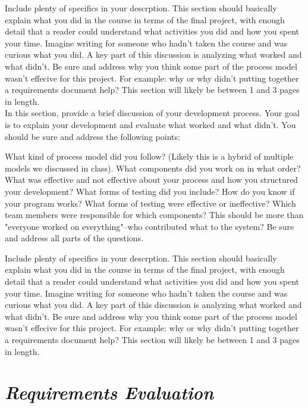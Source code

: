 \documentclass[12pt]{article}
\begin{document}
Include plenty of specifics in your descrption. This section should basically explain what you did in the course in terms of the final project, with enough detail that a reader could understand what activities you did and how you spent your time. Imagine writing for someone who hadn't taken the course and was curious what you did.
A key part of this discussion is analyzing what worked and what didn't. Be sure and address why you think some part of the process model wasn't effecive for this project. For example: why or why didn't putting together a requirements document help?
This section will likely be between 1 and 3 pages in length.\\ 

In this section, provide a brief discussion of your development process. Your goal is to explain your development and evaluate what worked and what didn't. You should be sure and address the following points:

What kind of process model did you follow? (Likely this is a hybrid of multiple models we discussed in class). What components did you work on in what order? What was effective and not effective about your process and how you structured your development?
What forms of testing did you include? How do you know if your program works? What forms of testing were effective or ineffective?
Which team members were responsible for which components? This should be more than "everyone worked on everything"--who contributed what to the system?
Be sure and address all parts of the questions.

Include plenty of specifics in your descrption. This section should basically explain what you did in the course in terms of the final project, with enough detail that a reader could understand what activities you did and how you spent your time. Imagine writing for someone who hadn't taken the course and was curious what you did.
A key part of this discussion is analyzing what worked and what didn't. Be sure and address why you think some part of the process model wasn't effecive for this project. For example: why or why didn't putting together a requirements document help?
This section will likely be between 1 and 3 pages in length.\\ 


\section{\emph{Requirements Evaluation}}
\end{document}
